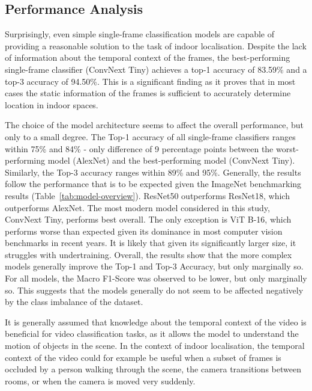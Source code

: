 \documentclass[a4paper]{article}
\begin{document}
\subsection{Performance Analysis} %
\label{sub:performance}

Surprisingly, even simple single-frame classification models are capable of
providing a reasonable solution to the task of indoor localisation. Despite the
lack of information about the temporal context of the frames, the
best-performing single-frame classifier (ConvNext Tiny) achieves a top-1
accuracy of 83.59\% and a top-3 accuracy of 94.50\%. This is a significant
finding as it proves that in most cases the static information of the frames is
sufficient to accurately determine location in indoor spaces.

The choice of the model architecture seems to affect the overall performance,
but only to a small degree. The Top-1 accuracy of all single-frame classifiers
ranges within 75\% and 84\% - only difference of 9 percentage points between the
worst-performing model (AlexNet) and the best-performing model (ConvNext Tiny).
Similarly, the Top-3 accuracy ranges within 89\% and 95\%. Generally, the
results follow the performance that is to be expected given the ImageNet
benchmarking results (Table~\ref{tab:model-overview}). ResNet50 outperforms
ResNet18, which outperforms AlexNet. The most modern model considered in this
study, ConvNext Tiny, performs best overall. The only exception is ViT B-16,
which performs worse than expected given its dominance in most computer vision
benchmarks in recent years. It is likely that given its significantly larger
size, it struggles with undertraining. Overall, the results show that the more
complex models generally improve the Top-1 and Top-3 Accuracy, but only
marginally so. For all models, the Macro F1-Score was observed to be lower, but
only marginally so. This suggests that the models generally do not seem to be
affected negatively by the class imbalance of the dataset.

It is generally assumed that knowledge about the temporal context of the video
is beneficial for video classification tasks, as it allows the model to
understand the motion of objects in the scene. In the context of indoor
localisation, the temporal context of the video could for example be useful when
a subset of frames is occluded by a person walking through the scene, the camera
transitions between rooms, or when the camera is moved very suddenly.
\end{document}

